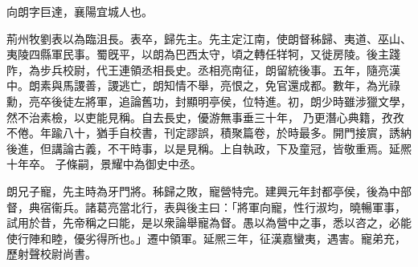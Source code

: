 \begin{pinyinscope}
 
 
 向朗字巨達，襄陽宜城人也。
 
 
 荊州牧劉表以為臨沮長。表卒，歸先主。先主定江南，使朗督秭歸、夷道、巫山、夷陵四縣軍民事。蜀旣平，以朗為巴西太守，頃之轉任䍧牱，又徙房陵。後主踐阼，為步兵校尉，代王連領丞相長史。丞相亮南征，朗留統後事。五年，隨亮漢中。朗素與馬謖善，謖逃亡，朗知情不舉，亮恨之，免官還成都。數年，為光祿勳，亮卒後徒左將軍，追論舊功，封顯明亭侯，位特進。初，朗少時雖涉獵文學，然不治素檢，以吏能見稱。自去長史，優游無事垂三十年，
 乃更潛心典籍，孜孜不倦。年踰八十，猶手自校書，刊定謬誤，積聚篇卷，於時最多。開門接賔，誘納後進，但講論古義，不干時事，以是見稱。上自執政，下及童冠，皆敬重焉。延熈十年卒。
 子條嗣，景耀中為御史中丞。
 
 
朗兄子寵，先主時為牙門將。秭歸之敗，寵營特完。建興元年封都亭侯，後為中部督，典宿衞兵。諸葛亮當北行，表與後主曰：「將軍向寵，性行淑均，曉暢軍事，試用於昔，先帝稱之曰能，是以衆論舉寵為督。愚以為營中之事，悉以咨之，必能使行陣和睦，優劣得所也。」遷中領軍。延熈三年，征漢嘉蠻夷，遇害。寵弟充，歷射聲校尉尚書。
 
 
\end{pinyinscope}